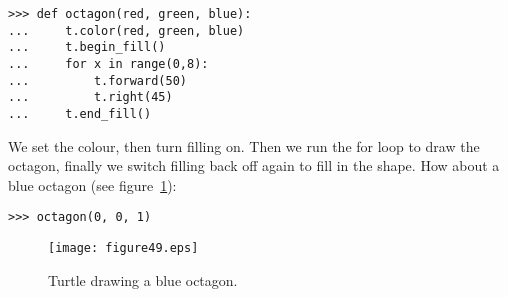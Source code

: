 \begin{listing}
\begin{verbatim}
>>> def octagon(red, green, blue):
...     t.color(red, green, blue)
...     t.begin_fill()
...     for x in range(0,8):
...         t.forward(50)
...         t.right(45)
...     t.end_fill()
\end{verbatim}
\end{listing}

We set the colour, then turn filling on.  Then we run the for loop to draw the octagon, finally we switch filling back off again to fill in the shape. How about a blue octagon (see figure~\ref{fig49}):

\begin{listing}
\begin{verbatim}
>>> octagon(0, 0, 1)
\end{verbatim}
\end{listing}

\begin{figure}
\begin{center}
\texttt{[image: figure49.eps]}
\end{center}
\caption{Turtle drawing a blue octagon.}\label{fig49}
\end{figure}
\newpage
